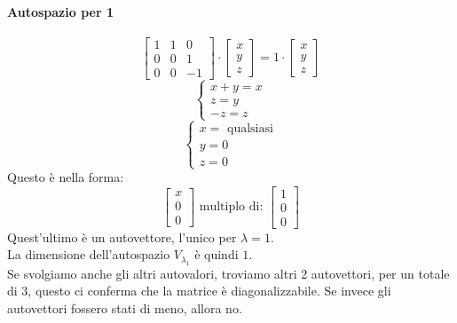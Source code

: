 \documentclass[12pt,a4paper]{article}
\begin{document}
\paragraph{Autospazio per 1}
\[
\begin{bmatrix}
  1 & 1 & 0\\
  0 & 0 & 1\\
  0 & 0 & -1
\end{bmatrix} \cdot \begin{bmatrix}
  x\\
  y\\
  z
\end{bmatrix} = 1 \cdot \begin{bmatrix}
  x\\
  y\\
  z
\end{bmatrix}
\]
\[
\begin{cases}
  x + y = x\\
  z = y\\
  -z = z
\end{cases}
\]
\[
\begin{cases}
  x = \text{ qualsiasi}\\
  y = 0\\
  z = 0
\end{cases}
\]
Questo è nella forma:
\[
\begin{bmatrix}
  x\\
  0\\
  0
\end{bmatrix} \text{ multiplo di: } \begin{bmatrix}
  1\\
  0\\
  0
\end{bmatrix}
\]
Quest'ultimo è un autovettore, l'unico per $\lambda = 1$.\\
La dimensione dell'autospazio $V_{\lambda_1}$ è quindi $1$.\\
Se svolgiamo anche gli altri autovalori, troviamo altri 2 autovettori, per un totale di 3, questo ci conferma che la matrice è diagonalizzabile.
Se invece gli autovettori fossero stati di meno, allora no.
\end{document}
